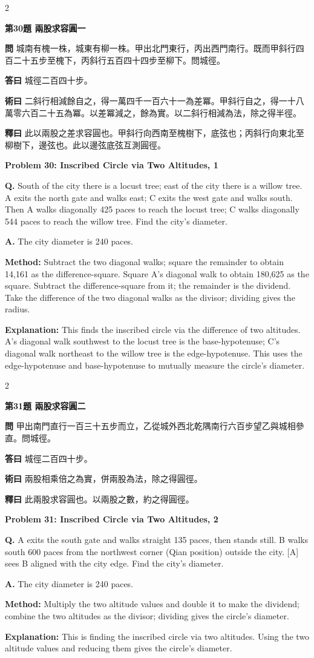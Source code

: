 \documentclass[11pt,a4paper]{article}
\newcommand{\wen}[1]{\noindent\textbf{問} #1\par\smallskip}
\newcommand{\da}[1]{\noindent\textbf{答曰} #1\par\smallskip}
\newcommand{\shu}[1]{\noindent\textbf{術曰} #1\par\smallskip}
\newcommand{\shi}[1]{\noindent\textbf{釋曰} #1\par\smallskip}
\newcommand{\wenE}[1]{\noindent\textbf{Q.} #1\par\smallskip}
\newcommand{\daE}[1]{\noindent\textbf{A.} #1\par\smallskip}
\newcommand{\shuE}[1]{\noindent\textbf{Method:} #1\par\smallskip}
\newcommand{\shiE}[1]{\noindent\textbf{Explanation:} #1\par\smallskip}
\begin{document}
\bigskip

\begin{paracol}{2}

\noindent\textbf{第30題 兩股求容圓一}

\wen{城南有槐一株，城東有柳一株。甲出北門東行，丙出西門南行。既而甲斜行四百二十五步至槐下，丙斜行五百四十四步至柳下。問城徑。}
\da{城徑二百四十步。}
\shu{二斜行相減餘自之，得一萬四千一百六十一為差冪。甲斜行自之，得一十八萬零六百二十五為冪。以差冪減之，餘為實。以二斜行相減為法，除之得半徑。}
\shi{此以兩股之差求容圓也。甲斜行向西南至槐樹下，底弦也；丙斜行向東北至柳樹下，邊弦也。此以邊弦底弦互測圓徑。}

\switchcolumn

\noindent\textbf{Problem 30: Inscribed Circle via Two Altitudes, 1}

\wenE{South of the city there is a locust tree; east of the city there is a willow tree. A exits the north gate and walks east; C exits the west gate and walks south. Then A walks diagonally 425 paces to reach the locust tree; C walks diagonally 544 paces to reach the willow tree. Find the city's diameter.}
\daE{The city diameter is 240 paces.}
\shuE{Subtract the two diagonal walks; square the remainder to obtain 14,161 as the difference-square. Square A's diagonal walk to obtain 180,625 as the square. Subtract the difference-square from it; the remainder is the dividend. Take the difference of the two diagonal walks as the divisor; dividing gives the radius.}
\shiE{This finds the inscribed circle via the difference of two altitudes. A's diagonal walk southwest to the locust tree is the base-hypotenuse; C's diagonal walk northeast to the willow tree is the edge-hypotenuse. This uses the edge-hypotenuse and base-hypotenuse to mutually measure the circle's diameter.}

\end{paracol}

\bigskip

\begin{paracol}{2}

\noindent\textbf{第31題 兩股求容圓二}

\wen{甲出南門直行一百三十五步而立，乙從城外西北乾隅南行六百步望乙與城相參直。問城徑。}
\da{城徑二百四十步。}
\shu{兩股相乘倍之為實，併兩股為法，除之得圓徑。}
\shi{此兩股求容圓也。以兩股之數，約之得圓徑。}

\switchcolumn

\noindent\textbf{Problem 31: Inscribed Circle via Two Altitudes, 2}

\wenE{A exits the south gate and walks straight 135 paces, then stands still. B walks south 600 paces from the northwest corner (Qian position) outside the city. [A] sees B aligned with the city edge. Find the city's diameter.}
\daE{The city diameter is 240 paces.}
\shuE{Multiply the two altitude values and double it to make the dividend; combine the two altitudes as the divisor; dividing gives the circle's diameter.}
\shiE{This is finding the inscribed circle via two altitudes. Using the two altitude values and reducing them gives the circle's diameter.}

\end{paracol}
\end{document}
